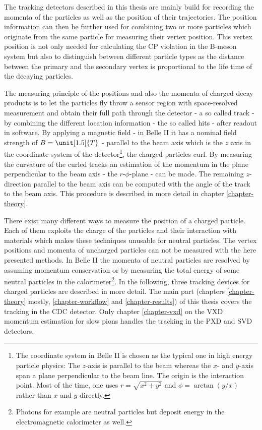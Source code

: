 The tracking detectors described in this thesis are mainly build for recording the momenta of the particles as well as the position of their trajectories. The position information can then be further used for combining two or more particles which originate from the same particle for measuring their vertex position. This vertex position is not only needed for calculating the CP violation in the B-meson system but also to distinguish between different particle types as the distance between the primary and the secondary vertex is proportional to the life time of the decaying particles. %

The measuring principle of the positions and also the momenta of charged decay products is to let the particles fly throw a sensor region with space-resolved measurement and obtain their full path through the detector - a so called track - by combining the different location information - the so called hits - after readout in software. By applying a magnetic field - in Belle II it has a nominal field strength of $B = \unit[1.5]{T}$ - parallel to the beam axis which is the $z$ axis in the coordinate system of the detector\footnote{The coordinate system in Belle II is chosen as the typical one in high energy particle physics\cite{coordinate}: The $z$-axis is parallel to the beam whereas the $x$- and $y$-axis span a plane perpendicular to the beam line. The origin is the interaction point. Most of the time, one uses $r = \sqrt{x^2 + y^2}$ and $\phi = \arctan(y/x)$ rather than $x$ and $y$ directly.}, the charged particles curl. By measuring the curvature of the curled tracks an estimation of the momentum in the plane perpendicular to the beam axis - the $r$-$\phi$-plane - can be made. The remaining $z$-direction parallel to the beam axis can be computed with the angle of the track to the beam axis. This procedure is described in more detail in chapter \ref{chapter-theory}.

There exist many different ways to measure the position of a charged particle. Each of them exploits the charge of the particles and their interaction with materials which makes these techniques unusable for neutral particles. The vertex positions and momenta of uncharged particles can not be measured with the here presented methods. In Belle II the momenta of neutral particles are resolved by assuming momentum conservation or by measuring the total energy of some neutral particles in the calorimeter\footnote{Photons for example are neutral particles but deposit energy in the electromagnetic calorimeter as well.}. In the following, three tracking devices for charged particles are described in more detail. The main part (chapters \ref{chapter-theory} mostly, \ref{chapter-workflow} and \ref{chapter-results}) of this thesis covers the tracking in the CDC detector. Only chapter \ref{chapter-vxd} on the VXD momentum estimation for slow pions handles the tracking in the PXD and SVD detectors.

